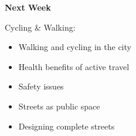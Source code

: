 \documentclass[aspectratio=169]{beamer}
\begin{document}







\begin{frame}
	\textbf{Next Week} 
	
	\vspace{4mm}
	
	Cycling \& Walking:
	
	\begin{itemize}
		
		
		
		\item Walking and cycling in the city
		
		\item Health benefits of active travel
		
		\item Safety issues
		
		\item Streets as public space
		
		\item Designing complete streets
		
		
		
	\end{itemize}

\end{frame}
\end{document}
